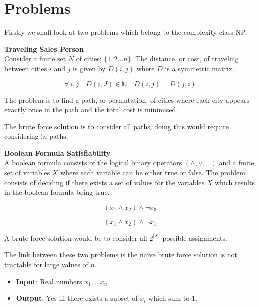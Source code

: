 \documentclass{article}
\theoremstyle{definition}
\begin{document}
\tableofcontents
\pagebreak

\section{Problems}
Firstly we shall look at two problems which belong to the complexity class NP.

\textbf{Traveling Sales Person}\\
Consider a finite set $N$ of cities; $\{1, 2 \dots n\}$. The distance, or cost,
of traveling between cities $i$ and $j$ is given by $D(i,j)$ where $D$
is a symmetric matrix.

$$\forall\ i, j\quad D(i,J) \in \mathbb{N}\quad D(i,j) = D(j,i)$$

The problem is to find a path, or permutation, of
cities where each city appears exactly once in the path and the total
cost is minimised.

The brute force solution is to consider all paths, doing this would require
considering $!n$ paths.

\textbf{Boolean Formula Satisfiability}\\
A boolean formula consists of the logical binary operators $(\land, \lor, \neg)$
and a finite set of variables $X$ where each variable can be either true or false.
The problem consists of deciding if there exists a set of values for the variables $X$
which results in the boolean formula being true.

$$(x_1 \land x_2) \land \neg x_3$$

$$(x_1 \land x_2) \land \neg x_1$$

A brute force solution would be to consider all $2^{|X|}$ possible assignments.

The link between these two problems is the na\"ive brute force solution is not
tractable for large values of $n$.

\begin{itemize}
    \item \textbf{Input}: Real numbers $x_1,\dots x_n$
    \item \textbf{Output}: Yes iff there exists a subset of $x_i$ which sum to 1.
\end{itemize}



\pagebreak




\pagebreak


\pagebreak


\pagebreak


%

\pagebreak


\pagebreak


\pagebreak

\end{document}
